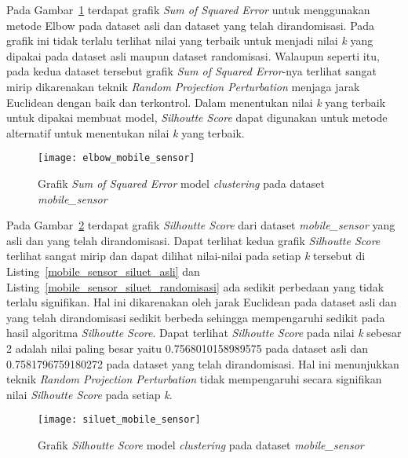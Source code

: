 Pada Gambar~\ref{fig:elbow_mobile_sensor} terdapat grafik \textit{Sum of Squared Error} untuk menggunakan metode Elbow pada dataset asli dan dataset yang telah dirandomisasi. Pada grafik ini tidak terlalu terlihat nilai yang terbaik untuk menjadi nilai \textit{k} yang dipakai pada dataset asli maupun dataset randomisasi. Walaupun seperti itu, pada kedua dataset tersebut grafik \textit{Sum of Squared Error}-nya terlihat sangat mirip dikarenakan teknik \textit{Random Projection Perturbation} menjaga jarak Euclidean dengan baik dan terkontrol. Dalam menentukan nilai \textit{k} yang terbaik untuk dipakai membuat model, \textit{Silhoutte Score} dapat digunakan untuk metode alternatif untuk menentukan nilai \textit{k} yang terbaik.

\begin{figure}
	\centering
	\texttt{[image: elbow\_mobile\_sensor]}
	\caption{Grafik \textit{Sum of Squared Error} model \textit{clustering} pada dataset \textit{mobile\_sensor}}
	\label{fig:elbow_mobile_sensor}
\end{figure}

Pada Gambar~\ref{fig:siluet_mobile_sensor} terdapat grafik \textit{Silhoutte Score} dari dataset \textit{mobile\_sensor} yang asli dan yang telah dirandomisasi. Dapat terlihat kedua grafik \textit{Silhoutte Score} terlihat sangat mirip dan dapat dilihat nilai-nilai pada setiap \textit{k} tersebut di Listing~\ref{mobile_sensor_siluet_asli} dan Listing~\ref{mobile_sensor_siluet_randomisasi} ada sedikit perbedaan yang tidak terlalu signifikan. Hal ini dikarenakan oleh jarak Euclidean pada dataset asli dan yang telah dirandomisasi sedikit berbeda sehingga mempengaruhi sedikit pada hasil algoritma \textit{Silhoutte Score}. Dapat terlihat \textit{Silhoutte Score} pada nilai \textit{k} sebesar 2 adalah nilai paling besar yaitu 0.7568010158989575 pada dataset asli dan 0.7581796759180272 pada dataset yang telah dirandomisasi. Hal ini menunjukkan teknik \textit{Random Projection Perturbation} tidak mempengaruhi secara signifikan nilai \textit{Silhoutte Score} pada setiap \textit{k}.

\begin{figure}
	\centering
	\texttt{[image: siluet\_mobile\_sensor]}
	\caption{Grafik \textit{Silhoutte Score} model \textit{clustering} pada dataset \textit{mobile\_sensor}}
	\label{fig:siluet_mobile_sensor}
\end{figure}
	
